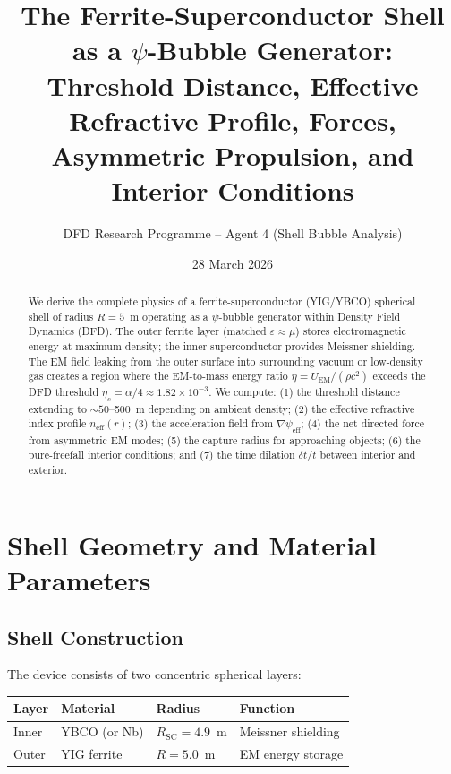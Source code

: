 \documentclass[amsmath,amssymb,aps,prd,superscriptaddress,nofootinbib]{revtex4-2}
\begin{document}
\title{The Ferrite-Superconductor Shell as a $\psi$-Bubble Generator:\\
Threshold Distance, Effective Refractive Profile, Forces,\\
Asymmetric Propulsion, and Interior Conditions}

\author{DFD Research Programme -- Agent 4 (Shell Bubble Analysis)}
\date{28 March 2026}

\begin{abstract}
We derive the complete physics of a ferrite-superconductor (YIG/YBCO)
spherical shell of radius $R = 5$~m operating as a $\psi$-bubble generator
within Density Field Dynamics (DFD). The outer ferrite layer (matched
$\varepsilon \approx \mu$) stores electromagnetic energy at maximum density;
the inner superconductor provides Meissner shielding. The EM field leaking
from the outer surface into surrounding vacuum or low-density gas creates
a region where the EM-to-mass energy ratio $\eta = U_\text{EM}/(\rho c^2)$
exceeds the DFD threshold $\eta_c = \alpha/4 \approx 1.82 \times 10^{-3}$.
We compute: (1) the threshold distance extending to $\sim 50$--500~m depending
on ambient density; (2) the effective refractive index profile $n_\text{eff}(r)$;
(3) the acceleration field from $\nabla\psi_\text{eff}$; (4) the net directed
force from asymmetric EM modes; (5) the capture radius for approaching objects;
(6) the pure-freefall interior conditions; and (7) the time dilation
$\delta t / t$ between interior and exterior.
\end{abstract}

\maketitle

\section{Shell Geometry and Material Parameters}\label{sec:shell}

\subsection{Shell Construction}

The device consists of two concentric spherical layers:

\begin{center}
\begin{tabular}{llll}
\toprule
Layer & Material & Radius & Function \\
\midrule
Inner & YBCO (or Nb) & $R_\text{SC} = 4.9$~m & Meissner shielding \\
Outer & YIG ferrite & $R = 5.0$~m & EM energy storage \\
\bottomrule
\end{tabular}
\end{center}
\end{document}
